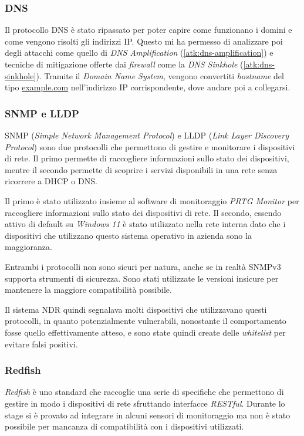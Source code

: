 \subsubsection{DNS}

Il protocollo DNS è stato ripassato per poter capire come funzionano i domini e come vengono risolti gli indirizzi IP. Questo mi ha permesso di analizzare poi degli attacchi come quello di \emph{DNS Amplification} (\autoref{atk:dns-amplification}) e tecniche di mitigazione offerte dai \emph{firewall} come la \emph{DNS Sinkhole} (\autoref{atk:dns-sinkhole}). Tramite il \emph{Domain Name System}, vengono convertiti \emph{hostname} del tipo \url{example.com} nell'indirizzo IP corrispondente, dove andare poi a collegarsi.

\subsubsection{SNMP e LLDP}

SNMP (\emph{Simple Network Management Protocol}) e LLDP (\emph{Link Layer Discovery Protocol}) sono due protocolli che permettono di gestire e monitorare i dispositivi di rete. Il primo permette di raccogliere informazioni sullo stato dei dispositivi, mentre il secondo permette di scoprire i servizi disponibili in una rete senza ricorrere a DHCP o DNS.

Il primo è stato utilizzato insieme al software di monitoraggio \emph{PRTG Monitor} per raccogliere informazioni sullo stato dei dispositivi di rete. Il secondo, essendo attivo di default su \emph{Windows 11} è stato utilizzato nella rete interna dato che i dispositivi che utilizzano questo sistema operativo in azienda sono la maggioranza.

Entrambi i protocolli non sono sicuri per natura, anche se in realtà SNMPv3 supporta strumenti di sicurezza. Sono stati utilizzate le versioni insicure per mantenere la maggiore compatibilità possibile. 

Il sistema NDR quindi segnalava molti dispositivi che utilizzavano questi protocolli, in quanto potenzialmente vulnerabili, nonostante il comportamento fosse quello effettivamente atteso, e sono state quindi create delle \emph{whitelist} per evitare falsi positivi.

\subsubsection{Redfish}

\emph{Redfish} è uno standard che raccoglie una serie di specifiche che permettono di gestire in modo i dispositivi di rete sfruttando interfacce \emph{RESTful}. Durante lo stage si è provato ad integrare in alcuni sensori di monitoraggio ma non è stato possibile per mancanza di compatibilità con i dispositivi utilizzati. 

